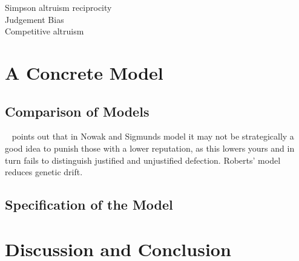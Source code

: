 \documentclass[twoside,twocolumn]{article}
\begin{document}
Simpson altruism reciprocity\\
Judgement Bias\\
Competitive altruism\\


\section{A Concrete Model}
\subsection{Comparison of Models}
~\cite{evoldirindir} points out that in Nowak and Sigmunds model it may not be strategically a good idea to punish those with a lower reputation, as this lowers yours and in turn fails to distinguish justified and unjustified defection. Roberts' model reduces genetic drift.

\subsection{Specification of the Model}



\section{Discussion and Conclusion}



{}


\end{document}
